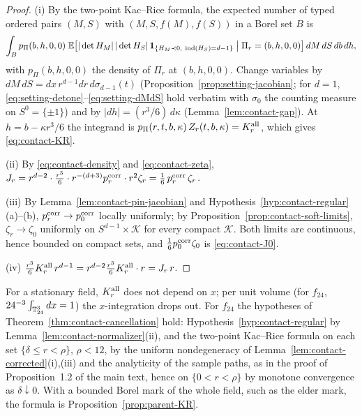 \begin{proof}
(i) By the two-point Kac--Rice formula, the expected number of typed ordered pairs $(M,S)$ with $(M,S,f(M),f(S))$ in a Borel set $B$ is
\[
\int_B p_{\Pi}(b,h,0,0)\;\E\bigl[|\det H_M|\,|\det H_S|\,\ind_{\{H_M\prec0,\ \Ind(H_S)=d-1\}}\bigm|\Pi_r=(b,h,0,0)\bigr]\,dM\,dS\,db\,dh,
\]
with $p_\Pi(b,h,0,0)$ the density of $\Pi_r$ at $(b,h,0,0)$. Change variables by $dM\,dS=dx\,r^{d-1}dr\,d\sigma_{d-1}(t)$ (Proposition~\ref{prop:setting-jacobian}; for $d=1$, \eqref{eq:setting-detone}--\eqref{eq:setting-dMdS} hold verbatim with $\sigma_0$ the counting measure on $S^0=\{\pm1\}$) and by $|dh|=(r^3/6)\,d\kappa$ (Lemma~\ref{lem:contact-gap}). At $h=b-\kappa r^3/6$ the integrand is $p_\Pi(r,t,b,\kappa)\,Z_r(t,b,\kappa)=K^{\rm all}_r$, which gives \eqref{eq:contact-KR}.

(ii) By \eqref{eq:contact-density} and \eqref{eq:contact-zeta}, $J_r=r^{d-2}\cdot\frac{r^3}6\cdot r^{-(d+3)}p^{\rm corr}_r\cdot r^2\zeta_r=\frac16\,p^{\rm corr}_r\,\zeta_r$.

(iii) By Lemma~\ref{lem:contact-pin-jacobian} and Hypothesis~\ref{hyp:contact-regular}(a)--(b), $p^{\rm corr}_r\to p^{\rm corr}_0$ locally uniformly; by Proposition~\ref{prop:contact-soft-limits}, $\zeta_r\to\zeta_0$ uniformly on $S^{d-1}\times\mathcal K$ for every compact $\mathcal K$. Both limits are continuous, hence bounded on compact sets, and $\frac16p^{\rm corr}_0\zeta_0$ is \eqref{eq:contact-J0}.

(iv) $\frac{r^3}6K^{\rm all}_r\,r^{d-1}=r^{d-2}\frac{r^3}6K^{\rm all}_r\cdot r=J_r\,r$.
\end{proof}

For a stationary field, $K^{\rm all}_r$ does not depend on $x$; per unit volume (for $f_{24}$, $24^{-3}\int_{\mathbb T^3_{24}}dx=1$) the $x$-integration drops out. For $f_{24}$ the hypotheses of Theorem~\ref{thm:contact-cancellation} hold: Hypothesis~\ref{hyp:contact-regular} by Lemma~\ref{lem:contact-normalizer}(ii), and the two-point Kac--Rice formula on each set $\{\delta\le r<\rho\}$, $\rho<12$, by the uniform nondegeneracy of Lemma~\ref{lem:contact-corrected}(i),(iii) and the analyticity of the sample paths, as in the proof of Proposition~1.2 of the main text, hence on $\{0<r<\rho\}$ by monotone convergence as $\delta\downarrow0$. With a bounded Borel mark of the whole field, such as the elder mark, the formula is Proposition~\ref{prop:parent-KR}.

